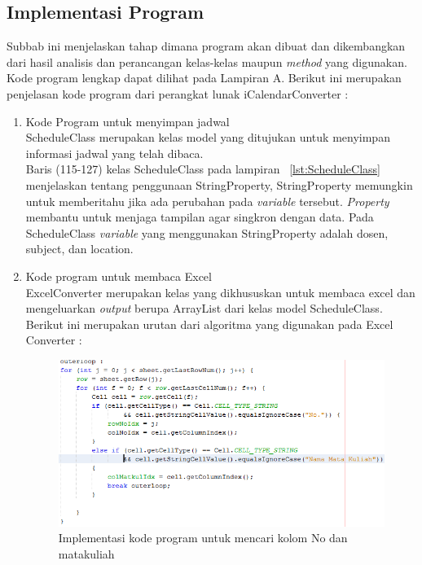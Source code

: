 \subsection{Implementasi Program}
Subbab ini menjelaskan tahap dimana program akan dibuat dan dikembangkan dari hasil analisis dan perancangan kelas-kelas maupun \textit{method} yang digunakan. Kode program lengkap dapat dilihat pada Lampiran A. 
Berikut ini merupakan penjelasan kode program dari perangkat lunak iCalendarConverter :
\begin{enumerate}
	\item Kode Program untuk menyimpan jadwal \\
	ScheduleClass merupakan kelas model yang ditujukan untuk menyimpan informasi jadwal yang telah dibaca.\\
	Baris (115-127) kelas ScheduleClass pada lampiran ~\ref{lst:ScheduleClass} menjelaskan tentang penggunaan StringProperty, 
	StringProperty memungkin untuk memberitahu jika ada perubahan pada \textit{variable} tersebut. \textit{Property} membantu untuk menjaga tampilan agar singkron dengan data. Pada ScheduleClass \textit{variable} yang menggunakan StringProperty adalah dosen, subject, dan location.	
	\item Kode program untuk membaca Excel \\
	ExcelConverter merupakan kelas yang dikhususkan untuk membaca excel dan mengeluarkan \textit{output} berupa ArrayList dari kelas model ScheduleClass.\\
	Berikut ini merupakan urutan dari algoritma yang digunakan pada Excel Converter :
	\begin{figure}[H]
		\centering
		\includegraphics[scale=0.7]{Gambar/excelConverter1}
		\caption{Implementasi kode program untuk mencari kolom No dan matakuliah}
		\label{fig:ExcelConverter1}
		\end{figure}
\begin{enumerate}

\end{enumerate}
\end{enumerate}
